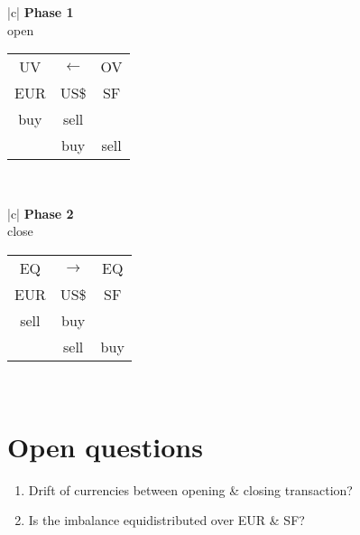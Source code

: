 \newpage

\begin{center}
\begin{tabular}{|c|}
\hline
{\bf \large Phase 1}  \\
open\\
\hline
\begin{tabular}{ccc}
UV&$\longleftarrow$&OV\\
EUR& US\$&SF\\
\hline
buy&sell&\\
   &buy & sell
\end{tabular}   \\
\hline
\end{tabular}
\end{center}

\begin{center}
\begin{tabular}{|c|}
\hline
{\bf \large Phase 2 } \\
close\\
\hline
\begin{tabular}{ccc}
EQ&$\longrightarrow$&EQ\\
EUR& US\$&SF\\
\hline
sell&buy&\\
   &sell & buy
\end{tabular} \\
\hline
\end{tabular}
\end{center}
\section*{Open questions}
\begin{enumerate}
\item
Drift of currencies between opening \& closing transaction?
\item
Is the imbalance equidistributed over EUR \& SF?
\end{enumerate}

\newpage

%




